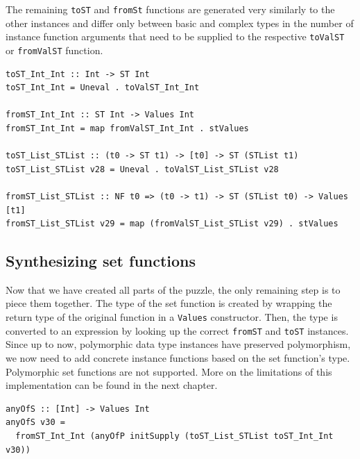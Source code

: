 \documentclass[a4paper, 11pt, fleqn]{scrreprt}
\newcommand{\cinline}[1]{\texttt{#1}}
\begin{document}
The remaining \cinline{toST} and \cinline{fromSt} functions are generated very similarly to the other instances and differ only between basic and complex types in the number of instance function arguments that need to be supplied to the respective \cinline{toValST} or \cinline{fromValST} function.

\begin{verbatim}
toST_Int_Int :: Int -> ST Int
toST_Int_Int = Uneval . toValST_Int_Int

fromST_Int_Int :: ST Int -> Values Int
fromST_Int_Int = map fromValST_Int_Int . stValues

toST_List_STList :: (t0 -> ST t1) -> [t0] -> ST (STList t1)
toST_List_STList v28 = Uneval . toValST_List_STList v28

fromST_List_STList :: NF t0 => (t0 -> t1) -> ST (STList t0) -> Values [t1]
fromST_List_STList v29 = map (fromValST_List_STList v29) . stValues
\end{verbatim}

\subsection{Synthesizing set functions}
Now that we have created all parts of the puzzle, the only remaining step is to piece them together. The type of the set function is created by wrapping the return type of the original function in a \cinline{Values} constructor. Then, the type is converted to an expression by looking up the correct \cinline{fromST} and \cinline{toST} instances. Since up to now, polymorphic data type instances have preserved polymorphism, we now need to add concrete instance functions based on the set function's type. Polymorphic set functions are not supported. More on the limitations of this implementation can be found in the next chapter.
\begin{verbatim}
anyOfS :: [Int] -> Values Int
anyOfS v30 =
  fromST_Int_Int (anyOfP initSupply (toST_List_STList toST_Int_Int v30))
\end{verbatim}
\end{document}
